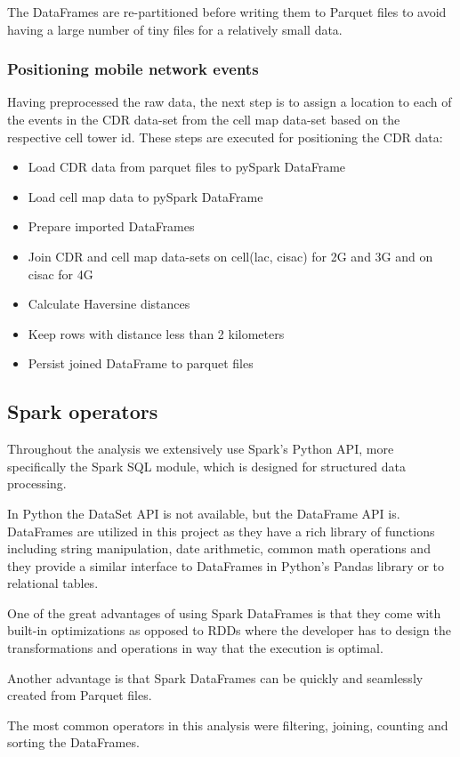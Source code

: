 The DataFrames are re-partitioned before writing them to Parquet files to avoid having a large number of tiny files for a relatively small data. 

\subsubsection{Positioning mobile network events}
Having preprocessed the raw data, the next step is to assign a location to each of the events in the CDR data-set from the cell map data-set based on the respective cell tower id. 
These steps are executed for positioning the CDR data:
\begin{itemize}
    \item Load CDR data from parquet files to pySpark DataFrame
    \item Load cell map data to pySpark DataFrame
    \item Prepare imported DataFrames
    \item Join CDR and cell map data-sets on cell(lac, cisac) for 2G and 3G and on cisac for 4G
    \item Calculate Haversine distances
    \item Keep rows with distance less than 2 kilometers
    \item Persist joined DataFrame to parquet files
\end{itemize}

\subsection{Spark operators}
Throughout the analysis we extensively use Spark's Python API, more specifically the Spark SQL module, which is designed for structured data processing.

In Python the DataSet API is not available, but the DataFrame API is. DataFrames are utilized in this project as they have a rich library of functions including string manipulation, date arithmetic, common math operations and they provide a similar interface to DataFrames in Python's Pandas library or to relational tables.

One of the great advantages of using Spark DataFrames is that they come with built-in optimizations as opposed to RDDs where the developer has to design the transformations and operations in way that the execution is optimal.

Another advantage is that Spark DataFrames can be quickly and seamlessly created from Parquet files.

The most common operators in this analysis were filtering, joining, counting and sorting the DataFrames. 